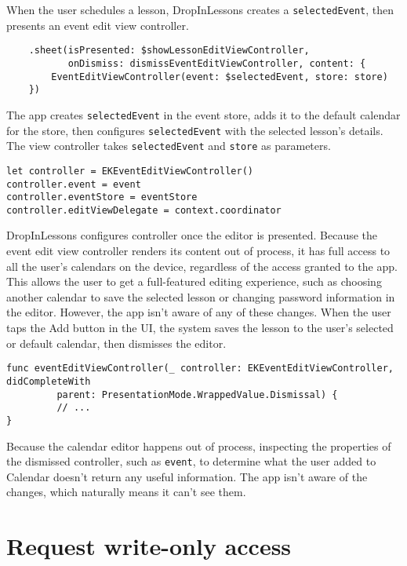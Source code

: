 \documentclass{article}
\begin{document}
When the user schedules a lesson, DropInLessons creates a \texttt{selectedEvent}, then presents an event edit view controller.

\begin{verbatim}
    .sheet(isPresented: $showLessonEditViewController,
           onDismiss: dismissEventEditViewController, content: {
        EventEditViewController(event: $selectedEvent, store: store)
    })
\end{verbatim}

The app creates \texttt{selectedEvent} in the event store, adds it to the default calendar for the store, then configures \texttt{selectedEvent} with the selected lesson's details. The view controller takes \texttt{selectedEvent} and \texttt{store} as parameters.

\begin{verbatim}
let controller = EKEventEditViewController()
controller.event = event
controller.eventStore = eventStore
controller.editViewDelegate = context.coordinator
\end{verbatim}

DropInLessons configures controller once the editor is presented. Because the event edit view controller renders its content out of process, it has full access to all the user's calendars on the device, regardless of the access granted to the app. This allows the user to get a full-featured editing experience, such as choosing another calendar to save the selected lesson or changing password information in the editor. However, the app isn't aware of any of these changes. When the user taps the Add button in the UI, the system saves the lesson to the user's selected or default calendar, then dismisses the editor.

\begin{verbatim}
func eventEditViewController(_ controller: EKEventEditViewController, didCompleteWith
         parent: PresentationMode.WrappedValue.Dismissal) {
         // ...
}
\end{verbatim}

Because the calendar editor happens out of process, inspecting the properties of the dismissed controller, such as \texttt{event}, to determine what the user added to Calendar doesn't return any useful information. The app isn't aware of the changes, which naturally means it can't see them.

\section*{Request write-only access}
\end{document}
